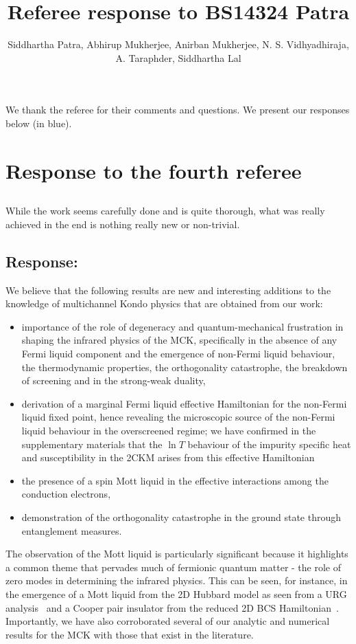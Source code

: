 \documentclass{article}
\title{Referee response to BS14324 Patra}
\author{Siddhartha Patra, Abhirup Mukherjee, Anirban Mukherjee, N. S. Vidhyadhiraja,\\ A. Taraphder, Siddhartha Lal}
\newcommand{\response}[1]{{\color{blue}\subsection*{Response:}{#1}}}
\newcommand{\point}[1]{\subsection{}{#1}}
\begin{document}
\maketitle

We thank the referee for their comments and questions. We present our responses below (in blue).

\section*{Response to the fourth referee}
\point{While the work seems carefully done and is quite thorough, what was really achieved in the end is nothing really new or non-trivial.}

\response{We believe that the following results are new and interesting additions to the knowledge of multichannel Kondo physics that are obtained from our work:
\begin{itemize}
	\item importance of the role of degeneracy and quantum-mechanical frustration in shaping the infrared physics of the MCK, specifically in the absence of any Fermi liquid component and the emergence of non-Fermi liquid behaviour, the thermodynamic properties, the orthogonality catastrophe, the breakdown of screening and in the strong-weak duality,
	\item derivation of a marginal Fermi liquid effective Hamiltonian for the non-Fermi liquid fixed point, hence revealing the microscopic source of the non-Fermi liquid behaviour in the overscreened regime; we have confirmed in the supplementary materials that the $\ln T$ behaviour of the impurity specific heat and susceptibility in the 2CKM arises from this effective Hamiltonian
	\item the presence of a spin Mott liquid in the effective interactions among the conduction electrons,
	\item demonstration of the orthogonality catastrophe in the ground state through entanglement measures.
\end{itemize}
The observation of the Mott liquid is particularly significant because it highlights a common theme that pervades much of fermionic quantum matter - the role of zero modes in determining the infrared physics. This can be seen, for instance, in the emergence of a Mott liquid from the 2D Hubbard model as seen from a URG analysis~\cite{anirbanmott1,anirbanmott2,mukherjeeMERG2022} and a Cooper pair insulator from the reduced 2D BCS Hamiltonian~\cite{siddharthacpi}. Importantly, we have also corroborated several of our analytic and numerical results for the MCK with those that exist in the literature.
}
\end{document}
